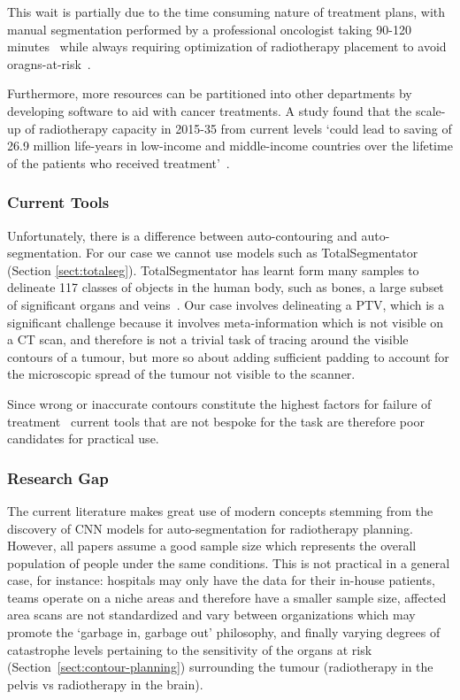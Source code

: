 \documentclass[11pt,twoside]{report}
\begin{document}
This wait is partially due to the time consuming nature of treatment plans, with manual segmentation performed by a professional oncologist taking 90-120 minutes~\cite{LIU2020184,Sartor2020-et} while always requiring optimization of radiotherapy placement to avoid oragns-at-risk~\cite{Samarasinghe2021-ps}.

Furthermore, more resources can be partitioned into other departments by developing software to aid with cancer treatments. A study found that the scale-up of radiotherapy capacity in 2015-35 from current levels `could lead to saving of 26.9 million life-years in low-income and middle-income countries over the lifetime of the patients who received treatment'~\cite{expanding-global-access-to-radiotherapy}.

\subsubsection{Current Tools}

Unfortunately, there is a difference between auto-contouring and auto-segmentation. For our case we cannot use models such as TotalSegmentator (Section \ref{sect:totalseg}). TotalSegmentator has learnt form many samples to delineate 117 classes of objects in the human body, such as bones, a large subset of significant organs and veins~\cite{totalsegmentor-git}. Our case involves delineating a PTV, which is a significant challenge because it involves meta-information which is not visible on a CT scan, and therefore is not a trivial task of tracing around the visible contours of a tumour, but more so about adding sufficient padding to account for the microscopic spread of the tumour not visible to the scanner.

Since wrong or inaccurate contours constitute the highest factors for failure of treatment~\cite{Rhee2020-ms} current tools that are not bespoke for the task are therefore poor candidates for practical use.

\subsubsection{Research Gap}

The current literature makes great use of modern concepts stemming from the discovery of CNN models for auto-segmentation for radiotherapy planning. However, all papers assume a good sample size which represents the overall population of people under the same conditions. This is not practical in a general case, for instance: hospitals may only have the data for their in-house patients, teams operate on a niche areas and therefore have a smaller sample size, affected area scans are not standardized and vary between organizations which may promote the `garbage in, garbage out' philosophy, and finally varying degrees of catastrophe levels pertaining to the sensitivity of the organs at risk (Section~\ref{sect:contour-planning}) surrounding the tumour (radiotherapy in the pelvis vs radiotherapy in the brain).
\end{document}
